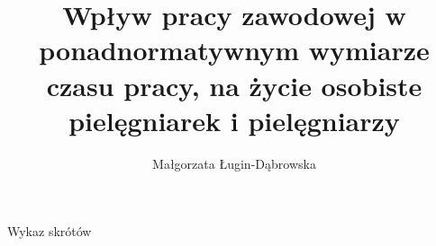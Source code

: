 \documentclass[a4paper,12pt,twoside,openright]{mwrep}
\title{Wpływ pracy zawodowej w ponadnormatywnym wymiarze czasu pracy, na życie osobiste pielęgniarek i pielęgniarzy}
\author{Małgorzata Ługin-Dąbrowska}
\newcommand{\nocontentsline}[3]{}
\newcommand{\tocless}[2]{\bgroup\let\addcontentsline=\nocontentsline#1{#2}\egroup}
\begin{document}
\sloppy
\maketitle


\tableofcontents


\newpage


\Large Wykaz skrótów
\normalsize

\end{document}
